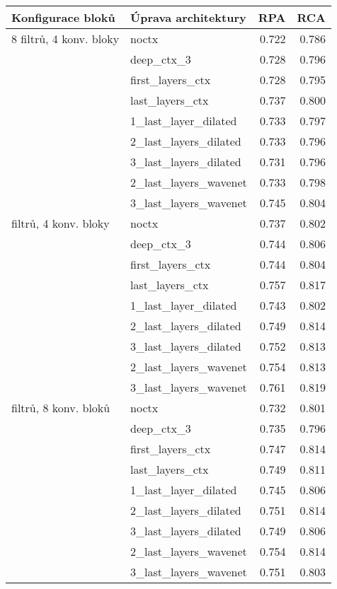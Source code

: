 \documentclass[12pt,a4paper]{report}
\begin{document}
\begin{table}[h]
\centering
\begin{tabular}{llrr}

\toprule
Konfigurace bloků & Úprava architektury &   RPA &   RCA \\
\midrule
8 filtrů, 4 konv. bloky & noctx & 0.722 & 0.786 \\
{} & deep\_ctx\_3 & 0.728 & 0.796 \\
{} & first\_layers\_ctx & 0.728 & 0.795 \\
{} & last\_layers\_ctx & 0.737 & 0.800 \\
{} & 1\_last\_layer\_dilated & 0.733 & 0.797 \\
{} & 2\_last\_layers\_dilated & 0.733 & 0.796 \\
{} & 3\_last\_layers\_dilated & 0.731 & 0.796 \\
{} & 2\_last\_layers\_wavenet & 0.733 & 0.798 \\
{} & 3\_last\_layers\_wavenet & 0.745 & 0.804 \\
\arrayrulecolor{black!30}\midrule
16 filtrů, 4 konv. bloky & noctx & 0.737 & 0.802 \\
{} & deep\_ctx\_3 & 0.744 & 0.806 \\
{} & first\_layers\_ctx & 0.744 & 0.804 \\
{} & last\_layers\_ctx & 0.757 & 0.817 \\
{} & 1\_last\_layer\_dilated & 0.743 & 0.802 \\
{} & 2\_last\_layers\_dilated & 0.749 & 0.814 \\
{} & 3\_last\_layers\_dilated & 0.752 & 0.813 \\
{} & 2\_last\_layers\_wavenet & 0.754 & 0.813 \\
{} & 3\_last\_layers\_wavenet & 0.761 & 0.819 \\
\arrayrulecolor{black!30}\midrule
8 filtrů, 8 konv. bloků & noctx & 0.732 & 0.801 \\
{} & deep\_ctx\_3 & 0.735 & 0.796 \\
{} & first\_layers\_ctx & 0.747 & 0.814 \\
{} & last\_layers\_ctx & 0.749 & 0.811 \\
{} & 1\_last\_layer\_dilated & 0.745 & 0.806 \\
{} & 2\_last\_layers\_dilated & 0.751 & 0.814 \\
{} & 3\_last\_layers\_dilated & 0.749 & 0.806 \\
{} & 2\_last\_layers\_wavenet & 0.754 & 0.814 \\
{} & 3\_last\_layers\_wavenet & 0.751 & 0.803 \\

\end{tabular}
\end{table}
\end{document}
